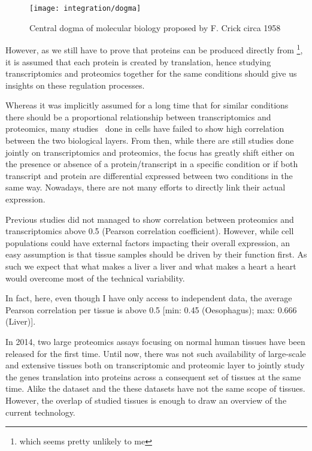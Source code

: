 \begin{figure}[!htbp]
    \texttt{[image: integration/dogma]}\centering
    \caption{\label{dogma} Central dogma of molecular biology proposed by F. Crick circa 1958}
\end{figure}

However, as we still have to prove that proteins can be produced directly
from \DNA\footnote{which seems pretty unlikely to me}, it is assumed that
each protein is created by translation, hence studying
transcriptomics and proteomics together for the same conditions should give us
insights on these regulation processes.

Whereas it was implicitly assumed for a long time that for similar conditions
there should be a proportional relationship between transcriptomics and proteomics,
many studies\
done in cells have failed to show high correlation between the two biological layers.
From then, while there are still studies done jointly on transcriptomics and
proteomics, the focus has greatly shift either on the presence or absence of a
protein/transcript in a specific condition or if both transcript and protein
are differential expressed between two conditions in the same way.
Nowadays, there are not many efforts to directly link their actual expression.

Previous studies did not managed to show correlation between proteomics and
transcriptomics above 0.5 (Pearson correlation coefficient).
However, while cell populations could have external factors impacting their overall
expression, an easy assumption is that tissue samples should be driven by their
function first. As such we expect that what makes a liver a liver and what makes
a heart a heart would overcome most of the technical variability.

In fact, here, even though I have only access to independent data, the average
Pearson correlation per tissue is above 0.5
[min: 0.45 (Oesophagus); max: 0.666 (Liver)].

In 2014, two large proteomics assays focusing on normal human tissues have been
released for the first time.
Until now, there was not such availability of large-scale and extensive tissues
both on transcriptomic and proteomic layer to jointly study the genes
translation into proteins across a consequent set of tissues
at the same time. Alike the  dataset and the 
these datasets have not the same scope of tissues. However, the overlap of
studied tissues is enough to draw an overview of the current technology.


